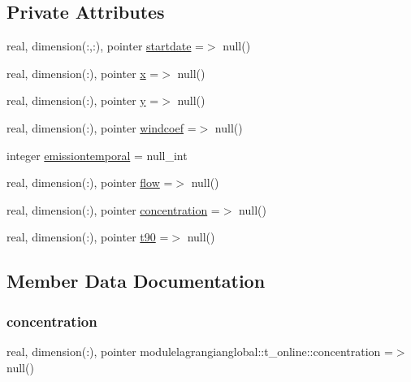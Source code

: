 \subsection*{Private Attributes}
\begin{DoxyCompactItemize}
\item 
real, dimension(\+:,\+:), pointer \mbox{\hyperlink{structmodulelagrangianglobal_1_1t__online_a7133c153ec0a230299b1b978932d9d5e}{startdate}} =$>$ null()
\item 
real, dimension(\+:), pointer \mbox{\hyperlink{structmodulelagrangianglobal_1_1t__online_aa16c4deeab046eb1fb18cef78d4a34a8}{x}} =$>$ null()
\item 
real, dimension(\+:), pointer \mbox{\hyperlink{structmodulelagrangianglobal_1_1t__online_aec5f694091cde9a0671071dbd7f6aed5}{y}} =$>$ null()
\item 
real, dimension(\+:), pointer \mbox{\hyperlink{structmodulelagrangianglobal_1_1t__online_aa564fd4e10ea88483cb95f3d22a9a84f}{windcoef}} =$>$ null()
\item 
integer \mbox{\hyperlink{structmodulelagrangianglobal_1_1t__online_a5c9e2d6bd50b43a65b818b305193189e}{emissiontemporal}} = null\+\_\+int
\item 
real, dimension(\+:), pointer \mbox{\hyperlink{structmodulelagrangianglobal_1_1t__online_ae542258d521af2b0a32b2bfe08153b09}{flow}} =$>$ null()
\item 
real, dimension(\+:), pointer \mbox{\hyperlink{structmodulelagrangianglobal_1_1t__online_a2defef28e01c333665a0acb81baf2183}{concentration}} =$>$ null()
\item 
real, dimension(\+:), pointer \mbox{\hyperlink{structmodulelagrangianglobal_1_1t__online_a3792df05022bc632aee1938833e606c8}{t90}} =$>$ null()
\end{DoxyCompactItemize}


\subsection{Member Data Documentation}
\mbox{\label{structmodulelagrangianglobal_1_1t__online_a2defef28e01c333665a0acb81baf2183}} 
\subsubsection{\texorpdfstring{concentration}{concentration}}
{\footnotesize\ttfamily real, dimension(\+:), pointer modulelagrangianglobal\+::t\+\_\+online\+::concentration =$>$ null()\hspace{0.3cm}{\ttfamily [private]}}

